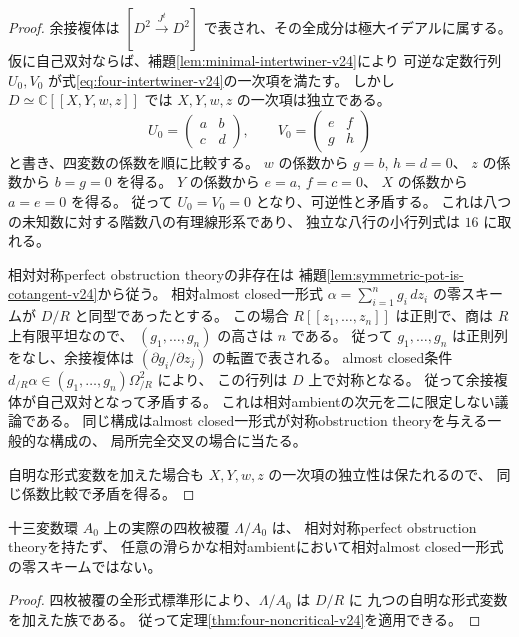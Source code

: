 \begin{proof}
余接複体は $[D^2\xrightarrow{J^t}D^2]$ で表され、その全成分は極大イデアルに属する。
仮に自己双対ならば、補題\ref{lem:minimal-intertwiner-v24}により
可逆な定数行列 $U_0,V_0$ が式\eqref{eq:four-intertwiner-v24}の一次項を満たす。
しかし $D\simeq\mathbb C[[X,Y,w,z]]$ では $X,Y,w,z$ の一次項は独立である。
\[
 U_0=\begin{pmatrix}a&b\\c&d\end{pmatrix},\qquad
 V_0=\begin{pmatrix}e&f\\g&h\end{pmatrix}
\]
と書き、四変数の係数を順に比較する。
$w$ の係数から $g=b$, $h=d=0$、
$z$ の係数から $b=g=0$ を得る。
$Y$ の係数から $e=a$, $f=c=0$、
$X$ の係数から $a=e=0$ を得る。
従って $U_0=V_0=0$ となり、可逆性と矛盾する。
これは八つの未知数に対する階数八の有理線形系であり、
独立な八行の小行列式は $16$ に取れる。

相対対称perfect obstruction theoryの非存在は
補題\ref{lem:symmetric-pot-is-cotangent-v24}から従う。
相対almost closed一形式 $\alpha=\sum_{i=1}^ng_i\,dz_i$ の零スキームが
$D/R$ と同型であったとする。
この場合 $R[[z_1,\ldots,z_n]]$ は正則で、商は $R$ 上有限平坦なので、
$(g_1,\ldots,g_n)$ の高さは $n$ である。
従って $g_1,\ldots,g_n$ は正則列をなし、余接複体は
$(\partial g_i/\partial z_j)$ の転置で表される。
almost closed条件 $d_{/R}\alpha\in(g_1,\ldots,g_n)\Omega^2_{/R}$ により、
この行列は $D$ 上で対称となる。
従って余接複体が自己双対となって矛盾する。
これは相対ambientの次元を二に限定しない議論である。
同じ構成はalmost closed一形式が対称obstruction theoryを与える一般的な構成の、
局所完全交叉の場合に当たる\cite[Example 1.19]{BehrendFantechiSymmetric}。

自明な形式変数を加えた場合も $X,Y,w,z$ の一次項の独立性は保たれるので、
同じ係数比較で矛盾を得る。
\end{proof}

\begin{corollary}\label{cor:actual-four-noncritical-v24}
十三変数環 $A_0$ 上の実際の四枚被覆 $\Lambda/A_0$ は、
相対対称perfect obstruction theoryを持たず、
任意の滑らかな相対ambientにおいて相対almost closed一形式の零スキームではない。
\end{corollary}

\begin{proof}
四枚被覆の全形式標準形により、$\Lambda/A_0$ は $D/R$ に
九つの自明な形式変数を加えた族である。
従って定理\ref{thm:four-noncritical-v24}を適用できる。
\end{proof}

